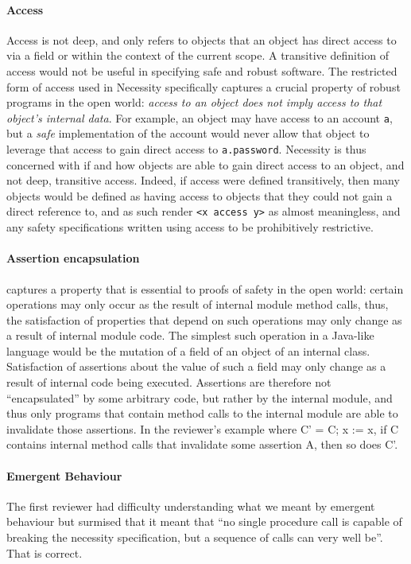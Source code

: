 \documentclass[11pt]{amsart}
\begin{document}
\paragraph{\textbf{Access}}  Access is not deep, and only refers to objects that an object has direct access to via a field or within the context of the current scope. 
A transitive definition of access would not be useful in specifying safe and robust software. The restricted form of access used in Necessity
specifically captures a crucial property of robust programs in the open world: \emph{access to an object does not imply access to that object's internal data}.
For example, an object may have access to an account \texttt{a}, but a \emph{safe} implementation of the account
would never allow that object to leverage that access to gain direct access to \texttt{a.password}.
Necessity is thus concerned with if and how objects are able to gain direct access to an object, and not deep, transitive access.
Indeed, if access were defined transitively, then many objects would be defined as having access to objects that they could not gain a direct reference to, 
and as such render \texttt{<x access y>} as almost meaningless, and any safety specifications written using access to be prohibitively restrictive.

\paragraph{\textbf{Assertion encapsulation}} captures a property that is essential to proofs of safety in the open world: certain operations may only occur as the result of internal module method calls, thus, the satisfaction of properties that depend on such operations may only change as a result of internal module code. The simplest such operation in a Java-like language would be the mutation of a field of an object of an internal class. Satisfaction of assertions about the value of such a field may only change as a result of internal code being executed. Assertions are therefore not ``encapsulated'' by some arbitrary code, but rather by the internal module, and thus only programs that contain method calls to the internal module are able to invalidate those assertions. In the reviewer's example where C' = C; x := x, if C contains internal method calls that invalidate some assertion A, then so does C'.

\paragraph{Emergent Behaviour} 
The first reviewer had difficulty understanding what we meant by emergent behaviour but surmised that it meant that  ``no single procedure call is capable of breaking the necessity specification, but a sequence of calls can very well be''. That is correct.
\end{document}
